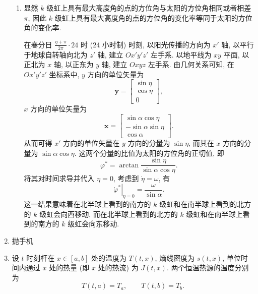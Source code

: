 \documentclass{article}
\begin{document}
\begin{enumerate}
\begin{enumerate}
	\item
	显然 $k$ 级虹上具有最大高度角的点的方位角与太阳的方位角相同或者相差 $\pi$, 因此 $k$ 级虹上具有最大高度角的点的方位角的变化率等同于太阳的方位角的变化率.

	在春分日 $\frac{\eta+\pi}{2\pi}\cdot 24$ 时 (24 小时制) 时刻, 以阳光传播的方向为 $x'$ 轴, 以平行于地球自转轴向北为 $z'$ 轴, 建立 $Ox'y'z'$ 左手系.
	以地平线为 $xy$ 平面, 以正北为 $x$ 轴, 以正东为 $y$ 轴, 建立 $Oxyz$ 左手系.
	由几何关系可知, 在 $Ox'y'z'$ 坐标系中, $y$ 方向的单位矢量为
	\begin{equation}
		\mathbf y=\left[\begin{matrix}\sin\eta \\ \cos\eta \\ 0\end{matrix}\right],
	\end{equation}
	$x$ 方向的单位矢量为
	\begin{equation}
		\mathbf x=\left[\begin{matrix}\sin\alpha\cos\eta \\ -\sin\alpha\sin\eta \\ \cos\alpha\end{matrix}\right].
	\end{equation}
	从而可得 $x'$ 方向的单位矢量在 $y$ 方向的分量为 $\sin\eta$, 而其在 $x$ 方向的分量为 $\sin\alpha\cos\eta$.
	这两个分量的比值为太阳的方位角的正切值, 即
	\begin{equation}
		\varphi^*=\arctan\frac{\sin\eta}{\sin\alpha\cos\eta}.
		\label{eq:太阳的方位角}
	\end{equation}
	将其对时间求导并代入 $\eta=0$, 考虑到 $\dot\eta=\omega$, 有
	\begin{equation}
		\left.\dot\varphi^*\right|_{\eta=0}=\frac\omega{\sin\alpha}.
	\end{equation}
	这一结果意味着在北半球上看到的南方的 $k$ 级虹和在南半球上看到的北方的 $k$ 级虹会向西移动, 而在北半球上看到的北方的 $k$ 级虹和在南半球上看到的南方的 $k$ 级虹会向东移动.

\end{enumerate}

\item
抛手机

\item
设 $t$ 时刻杆在 $x\in\left[a,b\right]$ 处的温度为 $T\left(t,x\right)$,
熵线密度为 $s\left(t,x\right)$,
单位时间内通过 $x$ 处的热量 (即 $x$ 处的热流) 为 $J\left(t,x\right)$.
两个恒温热源的温度分别为
\begin{equation}
	T\left(t,a\right)=T_a,\qquad T\left(t,b\right)=T_b.
	\label{eq:变分边界条件}
\end{equation}


\end{enumerate}
\end{document}
